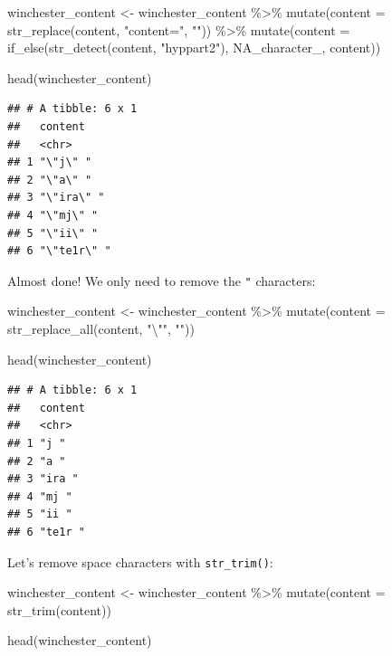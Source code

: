 \documentclass[
]{article}
\newenvironment{Shaded}{\begin{snugshade}}{\end{snugshade}}
\newcommand{\AttributeTok}[1]{\textcolor[rgb]{0.77,0.63,0.00}{#1}}
\newcommand{\ConstantTok}[1]{\textcolor[rgb]{0.00,0.00,0.00}{#1}}
\newcommand{\FunctionTok}[1]{\textcolor[rgb]{0.00,0.00,0.00}{#1}}
\newcommand{\NormalTok}[1]{#1}
\newcommand{\OtherTok}[1]{\textcolor[rgb]{0.56,0.35,0.01}{#1}}
\newcommand{\SpecialCharTok}[1]{\textcolor[rgb]{0.00,0.00,0.00}{#1}}
\newcommand{\StringTok}[1]{\textcolor[rgb]{0.31,0.60,0.02}{#1}}
\begin{document}
\begin{Shaded}
\begin{Highlighting}[]
\NormalTok{winchester\_content }\OtherTok{\textless{}{-}}\NormalTok{ winchester\_content }\SpecialCharTok{\%\textgreater{}\%} 
  \FunctionTok{mutate}\NormalTok{(}\AttributeTok{content =} \FunctionTok{str\_replace}\NormalTok{(content, }\StringTok{"content="}\NormalTok{, }\StringTok{""}\NormalTok{)) }\SpecialCharTok{\%\textgreater{}\%} 
  \FunctionTok{mutate}\NormalTok{(}\AttributeTok{content =} \FunctionTok{if\_else}\NormalTok{(}\FunctionTok{str\_detect}\NormalTok{(content, }\StringTok{"hyppart2"}\NormalTok{), }\ConstantTok{NA\_character\_}\NormalTok{, content))}

\FunctionTok{head}\NormalTok{(winchester\_content)}
\end{Highlighting}
\end{Shaded}

\begin{verbatim}
## # A tibble: 6 x 1
##   content    
##   <chr>      
## 1 "\"j\" "   
## 2 "\"a\" "   
## 3 "\"ira\" " 
## 4 "\"mj\" "  
## 5 "\"ii\" "  
## 6 "\"te1r\" "
\end{verbatim}

Almost done! We only need to remove the \texttt{"} characters:

\begin{Shaded}
\begin{Highlighting}[]
\NormalTok{winchester\_content }\OtherTok{\textless{}{-}}\NormalTok{ winchester\_content }\SpecialCharTok{\%\textgreater{}\%} 
  \FunctionTok{mutate}\NormalTok{(}\AttributeTok{content =} \FunctionTok{str\_replace\_all}\NormalTok{(content, }\StringTok{"}\SpecialCharTok{\textbackslash{}"}\StringTok{"}\NormalTok{, }\StringTok{""}\NormalTok{)) }

\FunctionTok{head}\NormalTok{(winchester\_content)}
\end{Highlighting}
\end{Shaded}

\begin{verbatim}
## # A tibble: 6 x 1
##   content
##   <chr>  
## 1 "j "   
## 2 "a "   
## 3 "ira " 
## 4 "mj "  
## 5 "ii "  
## 6 "te1r "
\end{verbatim}

Let's remove space characters with \texttt{str\_trim()}:

\begin{Shaded}
\begin{Highlighting}[]
\NormalTok{winchester\_content }\OtherTok{\textless{}{-}}\NormalTok{ winchester\_content }\SpecialCharTok{\%\textgreater{}\%} 
  \FunctionTok{mutate}\NormalTok{(}\AttributeTok{content =} \FunctionTok{str\_trim}\NormalTok{(content)) }

\FunctionTok{head}\NormalTok{(winchester\_content)}
\end{Highlighting}
\end{Shaded}
\end{document}
